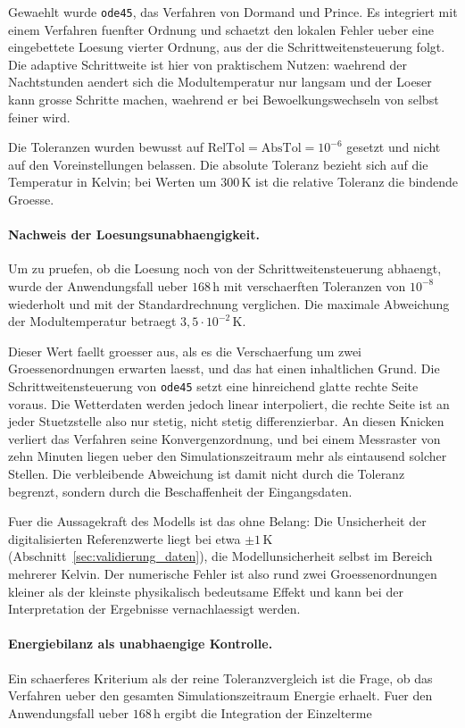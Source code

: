 Gewaehlt wurde \texttt{ode45}, das Verfahren von Dormand und Prince. Es
integriert mit einem Verfahren fuenfter Ordnung und schaetzt den lokalen
Fehler ueber eine eingebettete Loesung vierter Ordnung, aus der die
Schrittweitensteuerung folgt. Die adaptive Schrittweite ist hier von
praktischem Nutzen: waehrend der Nachtstunden aendert sich die
Modultemperatur nur langsam und der Loeser kann grosse Schritte machen,
waehrend er bei Bewoelkungswechseln von selbst feiner wird.

Die Toleranzen wurden bewusst auf $\mathrm{RelTol} = \mathrm{AbsTol} =
10^{-6}$ gesetzt und nicht auf den Voreinstellungen belassen. Die absolute
Toleranz bezieht sich auf die Temperatur in Kelvin; bei Werten um
$300\,\mathrm{K}$ ist die relative Toleranz die bindende Groesse.

\paragraph{Nachweis der Loesungsunabhaengigkeit.}
Um zu pruefen, ob die Loesung noch von der Schrittweitensteuerung abhaengt,
wurde der Anwendungsfall ueber $168\,\mathrm{h}$ mit verschaerften Toleranzen
von $10^{-8}$ wiederholt und mit der Standardrechnung verglichen. Die
maximale Abweichung der Modultemperatur betraegt
$3{,}5 \cdot 10^{-2}\,\mathrm{K}$.

Dieser Wert faellt groesser aus, als es die Verschaerfung um zwei
Groessenordnungen erwarten laesst, und das hat einen inhaltlichen Grund. Die
Schrittweitensteuerung von \texttt{ode45} setzt eine hinreichend glatte
rechte Seite voraus. Die Wetterdaten werden jedoch linear interpoliert, die
rechte Seite ist an jeder Stuetzstelle also nur stetig, nicht stetig
differenzierbar. An diesen Knicken verliert das Verfahren seine
Konvergenzordnung, und bei einem Messraster von zehn Minuten liegen ueber
den Simulationszeitraum mehr als eintausend solcher Stellen. Die verbleibende
Abweichung ist damit nicht durch die Toleranz begrenzt, sondern durch die
Beschaffenheit der Eingangsdaten.

Fuer die Aussagekraft des Modells ist das ohne Belang: Die Unsicherheit der
digitalisierten Referenzwerte liegt bei etwa $\pm 1\,\mathrm{K}$
(Abschnitt~\ref{sec:validierung_daten}), die Modellunsicherheit selbst im
Bereich mehrerer Kelvin. Der numerische Fehler ist also rund zwei
Groessenordnungen kleiner als der kleinste physikalisch bedeutsame Effekt und
kann bei der Interpretation der Ergebnisse vernachlaessigt werden.

\paragraph{Energiebilanz als unabhaengige Kontrolle.}
Ein schaerferes Kriterium als der reine Toleranzvergleich ist die Frage, ob
das Verfahren ueber den gesamten Simulationszeitraum Energie erhaelt. Fuer
den Anwendungsfall ueber $168\,\mathrm{h}$ ergibt die Integration der
Einzelterme

